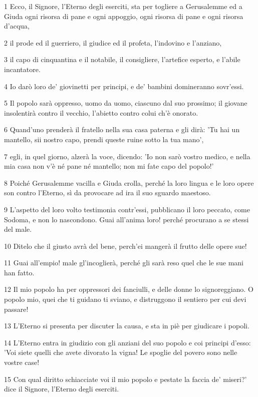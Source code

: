 \par 1 Ecco, il Signore, l'Eterno degli eserciti, sta per togliere a Gerusalemme ed a Giuda ogni risorsa di pane e ogni appoggio, ogni risorsa di pane e ogni risorsa d'acqua,
\par 2 il prode ed il guerriero, il giudice ed il profeta, l'indovino e l'anziano,
\par 3 il capo di cinquantina e il notabile, il consigliere, l'artefice esperto, e l'abile incantatore.
\par 4 Io darò loro de' giovinetti per principi, e de' bambini domineranno sovr'essi.
\par 5 Il popolo sarà oppresso, uomo da uomo, ciascuno dal suo prossimo; il giovane insolentirà contro il vecchio, l'abietto contro colui ch'è onorato.
\par 6 Quand'uno prenderà il fratello nella sua casa paterna e gli dirà: 'Tu hai un mantello, sii nostro capo, prendi queste ruine sotto la tua mano',
\par 7 egli, in quel giorno, alzerà la voce, dicendo: 'Io non sarò vostro medico, e nella mia casa non v'è né pane né mantello; non mi fate capo del popolo!'
\par 8 Poiché Gerusalemme vacilla e Giuda crolla, perché la loro lingua e le loro opere son contro l'Eterno, sì da provocare ad ira il suo sguardo maestoso.
\par 9 L'aspetto del loro volto testimonia contr'essi, pubblicano il loro peccato, come Sodoma, e non lo nascondono. Guai all'anima loro! perché procurano a se stessi del male.
\par 10 Ditelo che il giusto avrà del bene, perch'ei mangerà il frutto delle opere sue!
\par 11 Guai all'empio! male gl'incoglierà, perché gli sarà reso quel che le sue mani han fatto.
\par 12 Il mio popolo ha per oppressori dei fanciulli, e delle donne lo signoreggiano. O popolo mio, quei che ti guidano ti sviano, e distruggono il sentiero per cui devi passare!
\par 13 L'Eterno si presenta per discuter la causa, e sta in piè per giudicare i popoli.
\par 14 L'Eterno entra in giudizio con gli anziani del suo popolo e coi principi d'esso: 'Voi siete quelli che avete divorato la vigna! Le spoglie del povero sono nelle vostre case!
\par 15 Con qual diritto schiacciate voi il mio popolo e pestate la faccia de' miseri?' dice il Signore, l'Eterno degli eserciti.
